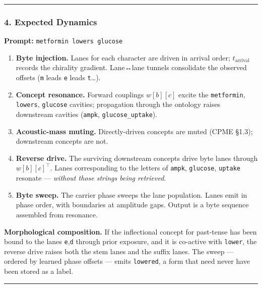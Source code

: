 \documentclass[
  11pt,
  a4paper,
]{article}
\providecommand{\tightlist}{%
  \setlength{\itemsep}{0pt}\setlength{\parskip}{0pt}}
\begin{document}
\begin{center}\rule{0.5\linewidth}{0.5pt}\end{center}

\subsubsection{4. Expected Dynamics}\label{expected-dynamics-4}

\textbf{Prompt:} \texttt{metformin\ lowers\ glucose}

\begin{enumerate}
\def\labelenumi{\arabic{enumi}.}
\tightlist
\item
  \textbf{Byte injection.} Lanes for each character are driven in
  arrival order; \(t_{\text{arrival}}\) records the chirality gradient.
  Lane↔lane tunnels consolidate the observed offsets (\texttt{m} leads
  \texttt{e} leads \texttt{t}\ldots).
\item
  \textbf{Concept resonance.} Forward couplings \(w[b][c]\) excite the
  \texttt{metformin}, \texttt{lowers}, \texttt{glucose} cavities;
  propagation through the ontology raises downstream cavities
  (\texttt{ampk}, \texttt{glucose\_uptake}).
\item
  \textbf{Acoustic-mass muting.} Directly-driven concepts are muted
  (CPME §1.3); downstream concepts are not.
\item
  \textbf{Reverse drive.} The surviving downstream concepts drive byte
  lanes through \(w[b][c]^{\!\top}\). Lanes corresponding to the letters
  of \texttt{ampk}, \texttt{glucose}, \texttt{uptake} resonate ---
  \emph{without those strings being retrieved}.
\item
  \textbf{Byte sweep.} The carrier phase sweeps the lane population.
  Lanes emit in phase order, with boundaries at amplitude gaps. Output
  is a byte sequence assembled from resonance.
\end{enumerate}

\textbf{Morphological composition.} If the inflectional concept for
past-tense has been bound to the lanes \texttt{e},\texttt{d} through
prior exposure, and it is co-active with \texttt{lower}, the reverse
drive raises both the stem lanes and the suffix lanes. The sweep ---
ordered by learned phase offsets --- emits \texttt{lowered}, a form that
need never have been stored as a label.

\begin{center}\rule{0.5\linewidth}{0.5pt}\end{center}
\end{document}
